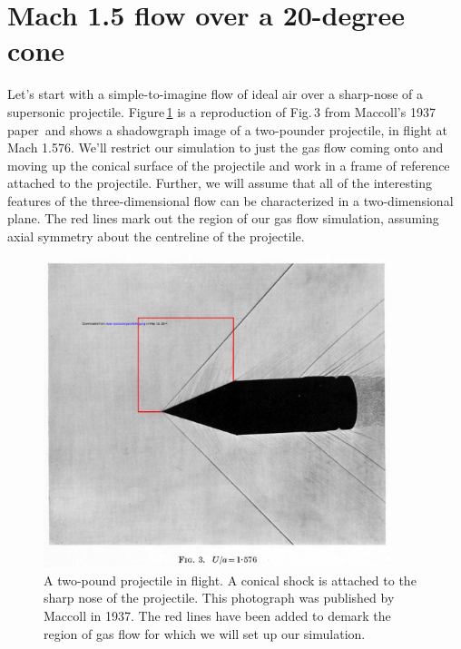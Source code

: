 
\section{Mach 1.5 flow over a 20-degree cone}
\label{cone20-simple-sec}
%
Let's start with a simple-to-imagine flow of ideal air over a sharp-nose of a supersonic projectile.
Figure\,\ref{cone20-flight-fig} is a reproduction of Fig.\,3 from Maccoll's 1937 paper\,\cite{maccoll_1937a} 
and shows a shadowgraph image of a two-pounder projectile, in flight at Mach 1.576.
We'll restrict our simulation to just the gas flow coming onto and moving up the conical surface 
of the projectile and work in a frame of reference attached to the projectile.
Further, we will assume that all of the interesting features of the three-dimensional flow can be 
characterized in a two-dimensional plane.
The red lines mark out the region of our gas flow simulation, 
assuming axial symmetry about the centreline of the projectile.

\begin{figure}[htbp]
\begin{center}
\includegraphics[width=0.9\textwidth, viewport=76 168 949 761, clip=true]{../2D/cone20-simple/maccoll-1937-fig3.pdf}
\end{center}
\caption{A two-pound projectile in flight.  A conical shock is attached to the sharp nose of the projectile. 
	 This photograph was published by Maccoll in 1937.
	 The red lines have been added to demark the region of gas flow for which we will set up our simulation.}
\label{cone20-flight-fig}
\end{figure}

